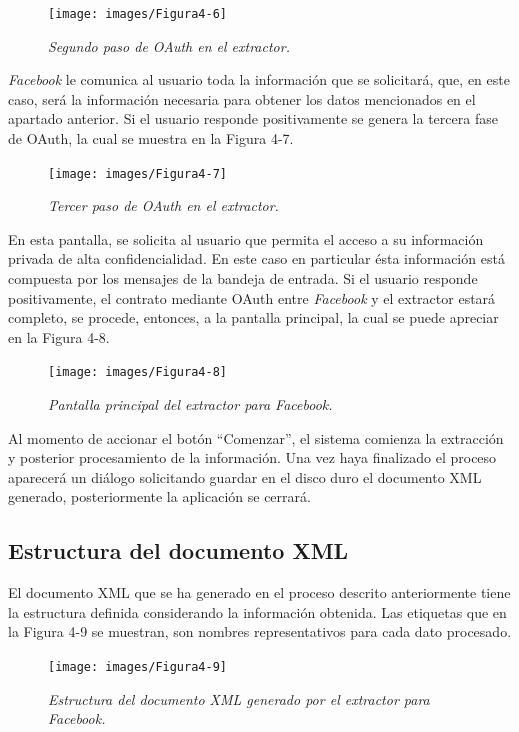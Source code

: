 \begin{figure}[h]
	\centering
	\texttt{[image: images/Figura4-6]}
	\caption{\em Segundo paso de OAuth en el extractor.}
	\label{fig:ext-im6}
\end{figure}

\textit{Facebook} le comunica al usuario toda la información que se solicitará, que, en este caso, será la información necesaria para obtener los datos mencionados en el apartado anterior. Si el usuario responde positivamente se genera la tercera fase de OAuth, la cual se muestra en la Figura 4-7.

\begin{figure}[h]
	\centering
	\texttt{[image: images/Figura4-7]}
	\caption{\em Tercer paso de OAuth en el extractor.}
	\label{fig:ext-im7}
\end{figure}

En esta pantalla, se solicita al usuario que permita el acceso a su información privada de alta confidencialidad. En este caso en particular ésta información está compuesta por los mensajes de la bandeja de entrada.
Si el usuario responde positivamente, el contrato mediante OAuth entre \textit{Facebook} y el extractor estará completo, se procede, entonces, a la pantalla principal, la cual se puede apreciar en la Figura 4-8.

\begin{figure}[h]
	\centering
	\texttt{[image: images/Figura4-8]}
	\caption{\em Pantalla principal del extractor para Facebook.}
	\label{fig:ext-im8}
\end{figure}

Al momento de accionar el botón “Comenzar”, el sistema comienza la extracción y posterior procesamiento de la información. Una vez haya finalizado el proceso aparecerá un diálogo solicitando guardar en el disco duro el documento XML generado, posteriormente la aplicación se cerrará.

\subsection{Estructura del documento XML}

El documento XML que se ha generado en el proceso descrito anteriormente tiene la estructura definida considerando la información obtenida. Las etiquetas que en la Figura 4-9 se muestran, son nombres representativos para cada dato procesado. 

\begin{figure}[h]
	\centering
	\texttt{[image: images/Figura4-9]}
	\caption{\em Estructura del documento XML generado por el extractor para Facebook.}
	\label{fig:ext-im9}
\end{figure}


